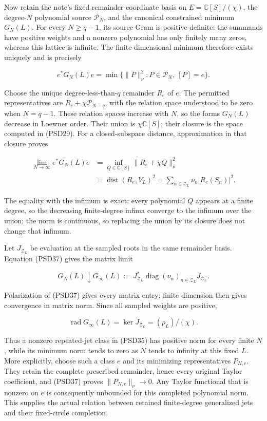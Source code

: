 \documentclass{article}
\begin{document}
Now retain the note's fixed remainder-coordinate basis on \(E=\mathbb C[S]/(\chi)\), the degree-\(N\) polynomial source \(\mathcal P_N\), and the canonical constrained minimum \(G_N(L)\). For every \(N\ge q-1\), its source Gram is positive definite: the summands have positive weights and a nonzero polynomial has only finitely many zeros, whereas this lattice is infinite. The finite-dimensional minimum therefore exists uniquely and is precisely

\[
e^*G_N(L)e=
\min\{\|P\|_\nu^2:P\in\mathcal P_N,\ [P]=e\}.
\tag{PSD36}
\]

Choose the unique degree-less-than-\(q\) remainder \(R_e\) of \(e\). The permitted representatives are \(R_e+\chi\mathcal P_{N-q}\), with the relation space understood to be zero when \(N=q-1\). These relation spaces increase with \(N\), so the forms \(G_N(L)\) decrease in Loewner order. Their union is \(\chi \mathbb C[S]\); their closure is the space computed in (PSD29). For a closed-subspace distance, approximation in that closure proves

\[
\begin{aligned}
\lim_{N\to\infty}e^*G_N(L)e
&=\inf_{Q\in\mathbb C[S]}\|R_e+\chi Q\|_\nu^2\\
&=\operatorname{dist}(R_e,V_L)^2
=\sum_{n\in\mathcal Z_L}\nu_n|R_e(S_n)|^2.
\end{aligned}
\tag{PSD37}
\]

The equality with the infimum is exact: every polynomial \(Q\) appears at a finite degree, so the decreasing finite-degree infima converge to the infimum over the union; the norm is continuous, so replacing the union by its closure does not change that infimum.

Let \(J_{\mathcal Z_L}\) be evaluation at the sampled roots in the same remainder basis. Equation (PSD37) gives the matrix limit

\[
G_N(L)\downarrow
G_\infty(L):=J_{\mathcal Z_L}^*
\operatorname{diag}(\nu_n)_{n\in\mathcal Z_L}J_{\mathcal Z_L}.
\tag{PSD38}
\]

Polarization of (PSD37) gives every matrix entry; finite dimension then gives convergence in matrix norm. Since all sampled weights are positive,

\[
\operatorname{rad}G_\infty(L)=\ker J_{\mathcal Z_L}
=(p_L)/(\chi).
\tag{PSD39}
\]

Thus a nonzero repeated-jet class in (PSD35) has positive norm for every finite \(N\), while its minimum norm tends to zero as \(N\) tends to infinity at this fixed \(L\). More explicitly, choose such a class \(e\) and its minimizing representatives \(P_{N,e}\). They retain the complete prescribed remainder, hence every original Taylor coefficient, and (PSD37) proves \(\|P_{N,e}\|_\nu\longrightarrow0\). Any Taylor functional that is nonzero on \(e\) is consequently unbounded for this completed polynomial norm. This supplies the actual relation between retained finite-degree generalized jets and their fixed-circle completion.
\end{document}
